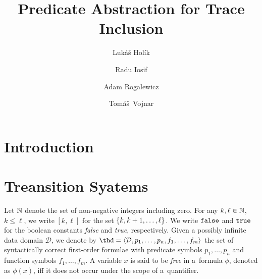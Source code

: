 \documentclass{llncs}
\begin{document}

\title{Predicate Abstraction for Trace Inclusion}

\author{Luk\'{a}\v{s} Hol\'{i}k \and Radu Iosif \and Adam Rogalewicz \and
Tom\'{a}\v{s}~Vojnar}
  
  
 \maketitle


\begin{abstract}\end{abstract}

\section{Introduction}

\section{Treansition Syatems}

Let ${\bf \mathbb{N}}$ denote the set of non-negative integers including zero. For
any $k,\ell \in {\bf \mathbb{N}}$, $k \leq \ell$, we write $[k,\ell]$ for the set
$\left\{ k,k+1,\ldots,\ell \right\}$. We write $\mathtt{false}$ and $\mathtt{true}$ for the
boolean constants \emph{false} and \emph{true}, respectively. Given a
possibly infinite data domain $\mathcal{D}$, we denote by
$\thd=\tuple{\mathcal{D}, p_1,\ldots,p_n, f_1,\ldots,f_m}$ the set of
syntactically correct first-order formulae with predicate
symbols $p_1,\ldots,p_n$ and function symbols $f_1,\ldots,f_m$. A variable $x$
is said to be \emph{free} in a~formula $\phi$, denoted as $\phi(x)$,
iff it does not occur under the scope of a~quantifier.
\end{document}
